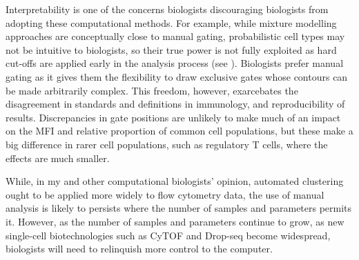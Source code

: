 Interpretability is one of the concerns biologists discouraging biologists from adopting these computational methods.
For example, while mixture modelling approaches are conceptually close to manual gating, probabilistic cell types may not be intuitive to biologists, so their true power is not fully exploited as hard cut-offs are applied early in the analysis process (see ).
Biologists prefer manual gating as it gives them the flexibility to draw exclusive gates whose contours can be made arbitrarily complex.
This freedom, however, exarcebates the disagreement in standards and definitions in immunology, and reproducibility of results.
Discrepancies in gate positions are unlikely to make much of an impact on the MFI and relative proportion of common cell populations, but these make a big difference in rarer cell populations, such as regulatory T cells, where the effects are much smaller.

While, in my and other computational biologists' opinion, automated clustering ought to be applied more widely to flow cytometry data, the use of manual analysis is likely to persists where the number of samples and parameters permits it.
However, as the number of samples and parameters continue to grow, as new single-cell biotechnologies such as CyTOF \citep{Becher:2014} and Drop-seq \citep{Macosko:2015} become widespread, biologists will need to relinquish more control to the computer.

